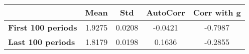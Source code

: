 \begin{tiny}\begin{tabular}{|l|c|c|c|c|}
\hline
&\textbf{Mean}&\textbf{Std}&\textbf{AutoCorr}&\textbf{Corr with g}\\\hline
\textbf{First 100 periods}&1.9275&0.0208&-0.0421&-0.7987\\\hline
\textbf{Last 100 periods}&1.8179&0.0198&0.1636&-0.2855\\\hline
\end{tabular}
\end{tiny}
